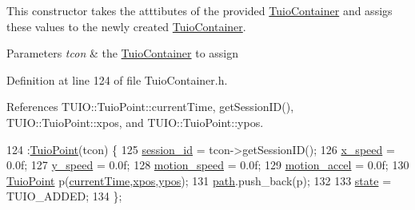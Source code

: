 This constructor takes the atttibutes of the provided \hyperlink{class_t_u_i_o_1_1_tuio_container}{Tuio\+Container} and assigs these values to the newly created \hyperlink{class_t_u_i_o_1_1_tuio_container}{Tuio\+Container}.


\begin{DoxyParams}{Parameters}
{\em tcon} & the \hyperlink{class_t_u_i_o_1_1_tuio_container}{Tuio\+Container} to assign \\
\hline
\end{DoxyParams}


Definition at line 124 of file Tuio\+Container.\+h.



References T\+U\+I\+O\+::\+Tuio\+Point\+::current\+Time, get\+Session\+I\+D(), T\+U\+I\+O\+::\+Tuio\+Point\+::xpos, and T\+U\+I\+O\+::\+Tuio\+Point\+::ypos.


\begin{DoxyCode}
124                                            :\hyperlink{class_t_u_i_o_1_1_tuio_point_a8611528cf41b797c51d6a9bf324157a5}{TuioPoint}(tcon) \{
125             \hyperlink{class_t_u_i_o_1_1_tuio_container_ab8249dadd0e87ff0b93078b731bec603}{session\_id} = tcon->getSessionID();
126             \hyperlink{class_t_u_i_o_1_1_tuio_container_a5ee28d0495d5cc4fa331ed0b14b9e176}{x\_speed} = 0.0f;
127             \hyperlink{class_t_u_i_o_1_1_tuio_container_a2499ba8d5c0d8ca4afc3b55ddff4ff1a}{y\_speed} = 0.0f;
128             \hyperlink{class_t_u_i_o_1_1_tuio_container_a7810725234e427d4508f6b6a9874723b}{motion\_speed} = 0.0f;
129             \hyperlink{class_t_u_i_o_1_1_tuio_container_adaa20f12158aee41f7502da330f2a97e}{motion\_accel} = 0.0f;
130             \hyperlink{class_t_u_i_o_1_1_tuio_point_a8611528cf41b797c51d6a9bf324157a5}{TuioPoint} p(\hyperlink{class_t_u_i_o_1_1_tuio_point_ad04658d52ab78e3e0ddc21584ceaa2ff}{currentTime},\hyperlink{class_t_u_i_o_1_1_tuio_point_a0021f8dfddd05f2a17e713a94f5457e6}{xpos},\hyperlink{class_t_u_i_o_1_1_tuio_point_a89a038775a681166168735dbc95c7779}{ypos});
131             \hyperlink{class_t_u_i_o_1_1_tuio_container_a4bdb8935091e0736b6c19ce9fd676b9a}{path}.push\_back(p);
132             
133             \hyperlink{class_t_u_i_o_1_1_tuio_container_a61cfc66997d3d2f2a503e20bd29ddbf1}{state} = TUIO\_ADDED;
134         \};
\end{DoxyCode}
\mbox{\label{class_t_u_i_o_1_1_tuio_container_a032e09099181219f292f404eeaf282f0}} 
